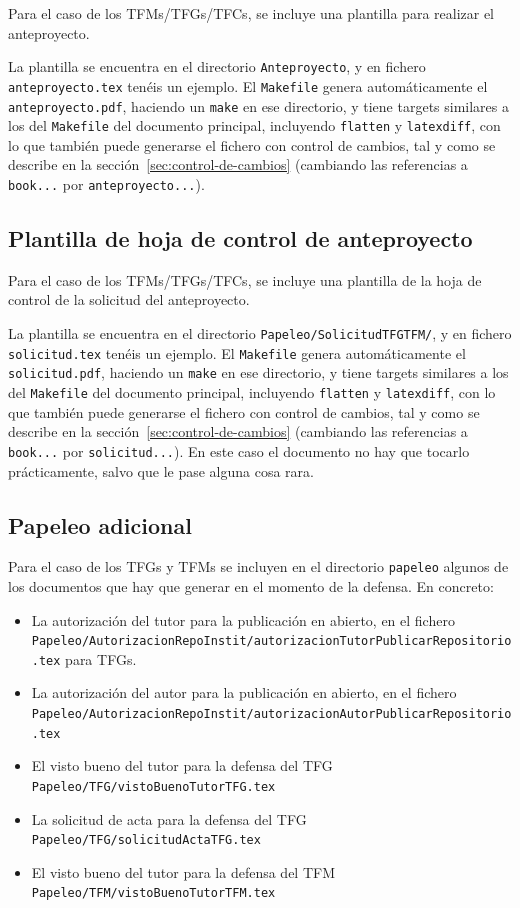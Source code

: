 \documentclass[spanish,openright]{book}
\begin{document}
Para el caso de los TFMs/TFGs/TFCs, se incluye una plantilla para
realizar el anteproyecto.

La plantilla se encuentra en el directorio \texttt{Anteproyecto}, y en
fichero \texttt{anteproyecto.tex} tenéis un ejemplo. El
\texttt{Makefile} genera automáticamente el \texttt{anteproyecto.pdf},
haciendo un \texttt{make} en ese directorio, y tiene targets similares a los
del \texttt{Makefile} del documento principal, incluyendo
\texttt{flatten} y \texttt{latexdiff}, con lo que también puede
generarse el fichero con control de cambios, tal y como se describe en
la sección~\ref{sec:control-de-cambios} (cambiando las referencias a
\texttt{book...} por \texttt{anteproyecto...}).

\subsection{Plantilla de hoja de control de anteproyecto}
\label{sec:plantilla-de-hoja-control-anteproyecto}

Para el caso de los TFMs/TFGs/TFCs, se incluye una plantilla de la hoja
de control de la solicitud del anteproyecto.

La plantilla se encuentra en el directorio \texttt{Papeleo/SolicitudTFGTFM/}, y en
fichero \texttt{solicitud.tex} tenéis un ejemplo. El
\texttt{Makefile} genera automáticamente el \texttt{solicitud.pdf},
haciendo un \texttt{make} en ese directorio, y tiene targets similares a los
del \texttt{Makefile} del documento principal, incluyendo
\texttt{flatten} y \texttt{latexdiff}, con lo que también puede
generarse el fichero con control de cambios, tal y como se describe en
la sección~\ref{sec:control-de-cambios} (cambiando las referencias a
\texttt{book...} por \texttt{solicitud...}). En este caso el documento
no hay que tocarlo prácticamente, salvo que le pase alguna cosa rara.


\subsection{Papeleo adicional}
\label{sec:introapp1}

Para el caso de los TFGs y TFMs se incluyen en el directorio
\texttt{papeleo} algunos de los documentos que hay que generar en el
momento de la defensa. En concreto:

\begin{itemize}
\item La autorización del tutor para la publicación en abierto, en el
fichero
\texttt{Papeleo/AutorizacionRepoInstit/autorizacionTutorPublicarRepositorio.tex}
para TFGs.
\item La autorización del autor para la publicación en abierto, en el
fichero
\texttt{Papeleo/AutorizacionRepoInstit/autorizacionAutorPublicarRepositorio.tex}
\item El visto bueno del tutor para la defensa del TFG
\texttt{Papeleo/TFG/vistoBuenoTutorTFG.tex}
\item La solicitud de acta para la defensa del TFG
\texttt{Papeleo/TFG/solicitudActaTFG.tex}
\item El visto bueno del tutor para la defensa del TFM
\texttt{Papeleo/TFM/vistoBuenoTutorTFM.tex}
\end{itemize}
\end{document}
